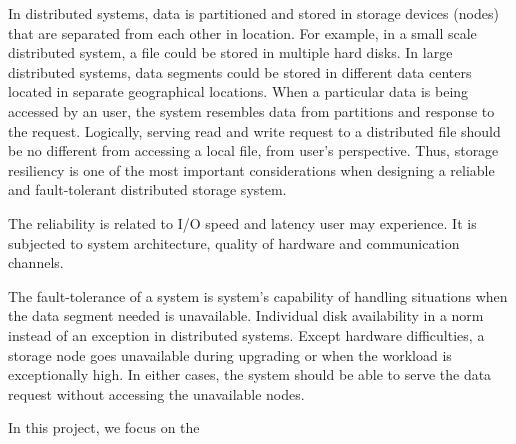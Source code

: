 In distributed systems, data is partitioned and stored in storage devices (nodes) that are separated from each other in location. For example, in a small scale distributed system, a file could be stored in multiple hard disks. In large distributed systems, data segments could be stored in different data centers located in separate geographical locations. When a particular data is being accessed by an user, the system resembles data from partitions and response to the request. Logically, serving read and write request to a distributed file should be no different from accessing a local file, from user's perspective. Thus, storage resiliency is one of the most important considerations when designing a reliable and fault-tolerant distributed storage system. 

The reliability is related to I/O speed and latency user may experience. It is subjected to system architecture, quality of hardware and communication channels. 

The fault-tolerance of a system is system's capability of handling situations when the data segment needed is unavailable. Individual disk availability in a norm instead of an exception in distributed systems. Except hardware difficulties, a storage node goes unavailable during upgrading or when the workload is exceptionally high. In either cases, the system should be able to serve the data request without accessing the unavailable nodes.


 
In this project, we focus on the 